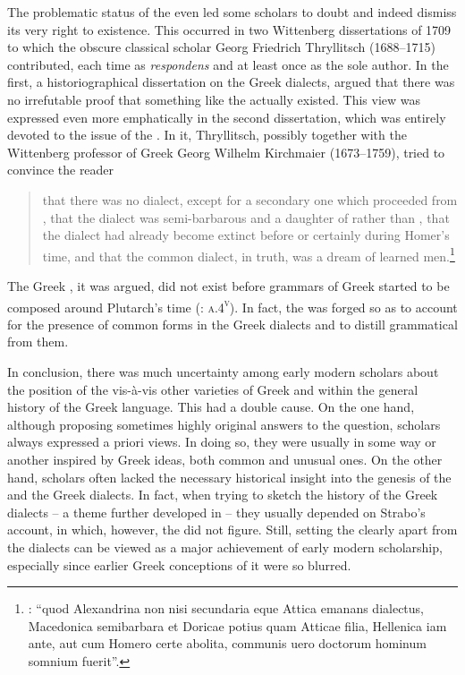 The problematic status of the  even led some scholars to doubt and indeed dismiss its very right to existence. This occurred in two Wittenberg dissertations of 1709 to which the obscure  classical scholar Georg Friedrich Thryllitsch (1688–1715) contributed, each time as \textit{respondens} and at least once as the sole author. In the first, a historiographical dissertation on the Greek dialects, \citet[\textsc{d.1}\textsc{\textsuperscript{v}}]{Thryllitsch1709} argued that there was no irrefutable proof that something like the  actually existed. This view was expressed even more emphatically in the second dissertation, which was entirely devoted to the issue of the . In it, Thryllitsch, possibly together with the Wittenberg professor of Greek Georg Wilhelm Kirchmaier (1673–1759), tried to convince the reader

\begin{quote}
that there was no  dialect, except for a secondary one which proceeded from , that the  dialect was semi-barbarous and a daughter of  rather than , that the  dialect had already become extinct before or certainly during Homer’s time, and that the common dialect, in truth, was a dream of learned men.\footnote{\citet[\textsc{c.2}\textsc{\textsuperscript{v}}]{Kirchmaier1709}: “quod Alexandrina non nisi secundaria eque Attica emanans dialectus, Macedonica semibarbara et Doricae potius quam Atticae filia, Hellenica iam ante, aut cum Homero certe abolita, communis uero doctorum hominum somnium fuerit”.}
\end{quote}

The Greek , it was argued, did not exist before grammars of Greek started to be composed around Plutarch’s time (\citealt{Kirchmaier1709}: \textsc{a.4}\textsc{\textsuperscript{v}}). In fact, the  was forged so as to account for the presence of common forms in the Greek dialects and to distill grammatical  from them.

In conclusion, there was much uncertainty among early modern scholars about the position of the  vis-à-vis other varieties of Greek and within the general history of the Greek language. This had a double cause. On the one hand, although proposing sometimes highly original answers to the question, scholars always expressed a priori views. In doing so, they were usually in some way or another inspired by Greek ideas, both common and unusual ones. On the other hand, scholars often lacked the necessary historical insight into the genesis of the  and the Greek dialects. In fact, when trying to sketch the history of the Greek dialects – a theme further developed in  – they usually depended on Strabo’s account, in which, however, the  did not figure. Still, setting the  clearly apart from the dialects can be viewed as a major achievement of early modern scholarship, especially since earlier Greek conceptions of it were so blurred.

